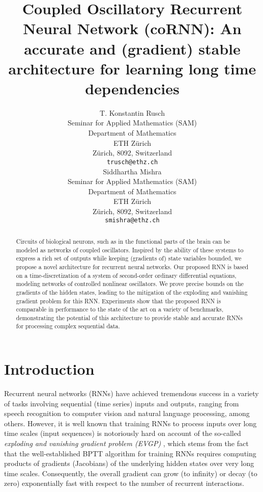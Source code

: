 \documentclass{article} \usepackage{iclr2021_conference,times}
\title{Coupled Oscillatory Recurrent Neural Network (coRNN): An accurate and (gradient) stable architecture for learning long time dependencies}
\author{T. Konstantin Rusch \\
  Seminar for Applied Mathematics (SAM)\\
  Department of Mathematics \\
  ETH Z\"urich\\
  Z\"urich, 8092, Switzerland \\
  \texttt{trusch@ethz.ch} \\
  \And
  Siddhartha Mishra \\
  Seminar for Applied Mathematics (SAM)\\
  Department of Mathematics \\
  ETH Z\"urich\\
  Z\"urich, 8092, Switzerland \\
  \texttt{smishra@ethz.ch} \\
}
\begin{document}
\maketitle

\begin{abstract}
Circuits of biological neurons, such as in the functional parts of the brain can be modeled as networks of coupled oscillators. Inspired by the ability of these systems to express a rich set of outputs while keeping (gradients of) state variables bounded, we propose a novel architecture for recurrent neural networks. Our proposed RNN is based on a time-discretization of a system of second-order ordinary differential equations, modeling networks of controlled nonlinear oscillators. We prove precise bounds on the gradients of the hidden states, leading to the mitigation of the exploding and vanishing gradient problem for this RNN. Experiments show that the proposed RNN is comparable in performance to the state of the art on a variety of benchmarks, demonstrating the potential of this architecture to provide stable and accurate RNNs for processing complex sequential data. 
\end{abstract}

\section{Introduction}
Recurrent neural networks (RNNs) have achieved tremendous success in a variety of tasks involving sequential (time series) inputs and outputs, ranging from speech recognition to computer vision and natural language processing, among others. However, it is well known that training RNNs to process inputs over long time scales (input sequences) is notoriously hard on account of the so-called \emph{exploding and vanishing gradient problem (EVGP)} \citep{vanish_grad}, which stems from the fact that the well-established BPTT algorithm for training RNNs requires computing products of gradients (Jacobians) of the underlying hidden states over very long time scales. Consequently, the overall gradient can grow (to infinity) or decay (to zero) exponentially fast with respect to the number of recurrent interactions.
\end{document}
